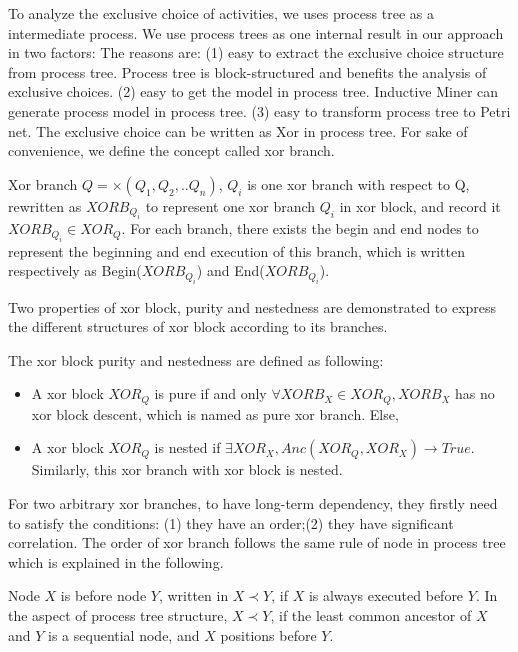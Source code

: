 To analyze the exclusive choice of activities, we uses process tree as a intermediate process. We use  process  trees as one internal result in  our  approach in two factors: The reasons are: (1) easy to extract the exclusive choice structure from process tree. Process tree is block-structured and benefits the analysis of exclusive choices. (2) easy to get the model in process tree. Inductive Miner can generate process model in process tree. (3) easy to transform process tree to Petri net. 
The exclusive choice can be written as Xor in process tree. For sake of convenience, we define the concept called xor branch. 
\begin{definition}{Xor branch}
$Q= \times(Q_1 , Q_2 ,.. Q_n)$, $Q_i$ is one xor branch with respect to Q, rewritten as $XORB_{Q_i}$ to represent one xor branch $Q_i$ in xor block, and record it $XORB_{Q_i} \in XOR_{Q}$. For each branch, there exists the begin and end nodes to represent the beginning and end execution of this branch, which is written respectively as Begin($XORB_{Q_i}$) and End($XORB_{Q_i}$).	
\end{definition}
Two properties of xor block, purity and nestedness are demonstrated to express the different structures of xor block according to its branches.
\begin{definition} The xor block purity and nestedness are defined as following: \\
	\begin{itemize}
		\item A xor block $XOR_Q$ is pure if and only $\forall XORB_X \in XOR_Q, XORB_X $ has no xor block descent, which is named as pure xor branch. Else,
		\item A xor block $XOR_Q$ is nested if $ \exists XOR_X, Anc(XOR_Q, XOR_X) \rightarrow True  $. Similarly, this xor branch with xor block is nested.
	\end{itemize}
\end{definition}

For two arbitrary xor branches, to have long-term dependency, they firstly need to satisfy the conditions: (1) they have an order;(2) they have significant correlation.
The order of xor branch follows the same rule of node in process tree which is explained in the following.
\begin{definition}
	Node $X$ is before node $Y$, written in $X \prec Y$, if $X$ is always executed before $Y$.  In the aspect of process tree structure, $X \prec Y$, if the least common ancestor of $X$ and $Y$ is a sequential node, and $X$ positions before $Y$.
\end{definition} 

